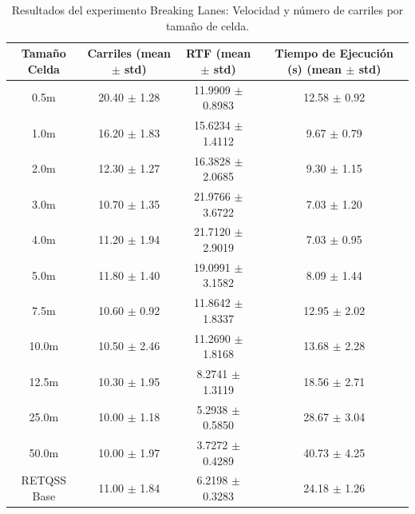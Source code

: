 \begin{table}[htbp]
\centering
\caption{Resultados del experimento Breaking Lanes: Velocidad y número de carriles por tamaño de celda.}
\label{tab:breaking_lanes}
\begin{tabular}{cccc}
\hline
Tamaño Celda & Carriles (mean $\pm$ std) & RTF (mean $\pm$ std) & Tiempo de Ejecución (s) (mean $\pm$ std) \\
\hline
0.5m & 20.40 $\pm$ 1.28 & 11.9909 $\pm$ 0.8983 & 12.58 $\pm$ 0.92 \\
1.0m & 16.20 $\pm$ 1.83 & 15.6234 $\pm$ 1.4112 & 9.67 $\pm$ 0.79 \\
2.0m & 12.30 $\pm$ 1.27 & 16.3828 $\pm$ 2.0685 & 9.30 $\pm$ 1.15 \\
3.0m & 10.70 $\pm$ 1.35 & 21.9766 $\pm$ 3.6722 & 7.03 $\pm$ 1.20 \\
4.0m & 11.20 $\pm$ 1.94 & 21.7120 $\pm$ 2.9019 & 7.03 $\pm$ 0.95 \\
5.0m & 11.80 $\pm$ 1.40 & 19.0991 $\pm$ 3.1582 & 8.09 $\pm$ 1.44 \\
7.5m & 10.60 $\pm$ 0.92 & 11.8642 $\pm$ 1.8337 & 12.95 $\pm$ 2.02 \\
10.0m & 10.50 $\pm$ 2.46 & 11.2690 $\pm$ 1.8168 & 13.68 $\pm$ 2.28 \\
12.5m & 10.30 $\pm$ 1.95 & 8.2741 $\pm$ 1.3119 & 18.56 $\pm$ 2.71 \\
25.0m & 10.00 $\pm$ 1.18 & 5.2938 $\pm$ 0.5850 & 28.67 $\pm$ 3.04 \\
50.0m & 10.00 $\pm$ 1.97 & 3.7272 $\pm$ 0.4289 & 40.73 $\pm$ 4.25 \\
RETQSS Base & 11.00 $\pm$ 1.84 & 6.2198 $\pm$ 0.3283 & 24.18 $\pm$ 1.26 \\
\hline
\end{tabular}
\end{table}
